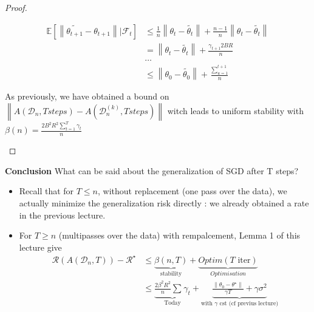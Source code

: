 \begin{proof}
\begin{itemize}
        \begin{align*}
            \mathbb{E}[ \left\| \tilde{\theta_{t+1}} - \theta_{t+1} \right\| | \mathcal{F}_t] &\leq \frac{1}{n} \left\| \theta_{t} - \tilde{\theta_{t}} \right\| + \frac{n-1}{n} \left\| \theta_{t} - \tilde{\theta_{t}} \right\| \\
            & = \left\| \theta_{t} - \tilde{\theta_{t}} \right\| + \frac{\gamma _ {t+1} 2BR}{n} \\
            & \dots \\
            & \leq \left\| \theta_0 - \tilde{\theta _0} \right\|  + \frac{\sum_{u=1}^{t+1}}{n}
        \end{align*}

        As previously, we have obtained a bound on $\left\| A(\mathcal{D}_n, T steps) - A(\mathcal{D}_n^{(k)}, T steps) \right\| $ witch leads to uniform stability with $\beta (n) = \frac{2B^2R^2 \sum_{t=1}^{T}\gamma _t}{n}$
    \end{itemize}
\end{proof}
        
\textbf{Conclusion} What can be said about the generalization of SGD after T steps?
\begin{itemize}
    \item Recall that for $T \leq n$, without replacement (one pass over the data), we actually minimize the generalization risk directly : we already obtained a rate in the previous lecture. 
    \item For $ T \geq n $ (multipasses over the data) with rempalcement, Lemma 1 of this lecture give 
    \begin{align*}
        \mathcal{R}(A(\mathcal{D}_n, T)) - \mathcal{R}^\star 
        &\leq \underbrace{\beta (n,T)}_{\text{stability}} + \underbrace{Optim(T \text{ iter})}_{Optimisation} \\
        &\leq \underbrace{\frac{2 \beta ^2 R^2}{n }\sum_{}^{}\gamma _t}_{\text{Today}} + \underbrace{\frac{\left\| \theta _0 - \theta ^\star  \right\| }{\gamma T } + \gamma \sigma ^2}_{\text{with } \gamma \text{ cst (cf previus lecture)} }
    \end{align*}
\end{itemize}

